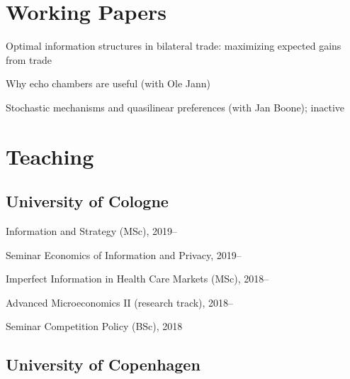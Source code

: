 \documentclass[a4paper]{article}
\renewenvironment{itemize}{
  \begin{list}{}{
    \setlength{\leftmargin}{1.5em}
  }
}{
  \end{list}
}
\begin{document}
\section*{Working Papers}

\begin{itemize}
\item Optimal information structures in bilateral trade: maximizing expected gains from trade

\item Why echo chambers are useful (with Ole Jann)
  
\item Stochastic mechanisms and quasilinear preferences (with Jan Boone); inactive

\end{itemize}




\section*{Teaching} 

\subsection*{University of Cologne}
\begin{itemize}
\item Information and Strategy (MSc), 2019--
  \item Seminar Economics of Information and Privacy, 2019--
  \item Imperfect Information in Health Care Markets (MSc), 2018--
\item Advanced Microeconomics II (research track), 2018--
  \item Seminar Competition Policy (BSc), 2018
\end{itemize}

\subsection*{University of Copenhagen}
\end{document}
